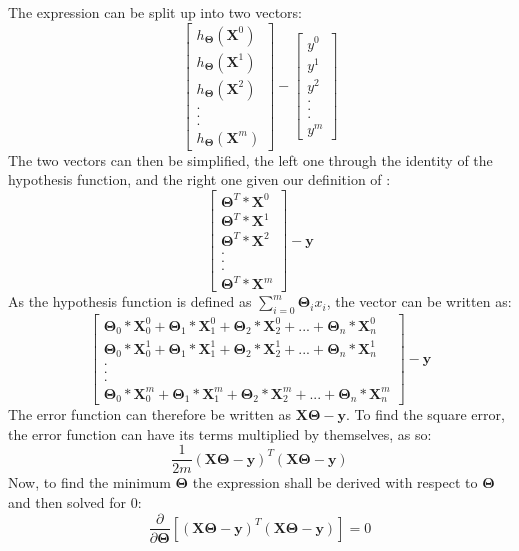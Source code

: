 \documentclass[a4paper,12pt]{article}
\begin{document}
The expression can be split up into two vectors: 
\[\begin{bmatrix} h_{\boldsymbol{\Theta}} (\boldsymbol{X}^0) \\ h_{\boldsymbol{\Theta}} (\boldsymbol{X}^1) \\ h_{\boldsymbol{\Theta}} (\boldsymbol{X}^2) \\ . \\ . \\ . \\ h_{\boldsymbol{\Theta}} (\boldsymbol{X}^m) \end{bmatrix} - \begin{bmatrix} y^0 \\ y^1 \\ y^2 \\ . \\ . \\ . \\ y^m \end{bmatrix}\]
The two vectors can then be simplified, the left one through the identity of the hypothesis function, and the right one given our definition of \unboldmath:
\[\begin{bmatrix} \boldsymbol{\Theta}^T * \boldsymbol{X}^0 \\ \boldsymbol{\Theta}^T * \boldsymbol{X}^1 \\ \boldsymbol{\Theta}^T * \boldsymbol{X}^2 \\ . \\ . \\ . \\ \boldsymbol{\Theta}^T * \boldsymbol{X}^m \end{bmatrix} - \boldsymbol{y}\]
As the hypothesis function is defined as \(\sum_{i=0}^m \boldsymbol{\Theta}_i x_i\), the vector can be written as:
\[\begin{bmatrix} \boldsymbol{\Theta}_0 * \boldsymbol{X}_0^0 + \boldsymbol{\Theta}_1 * \boldsymbol{X}_1^0 + \boldsymbol{\Theta}_2 * \boldsymbol{X}_2^0 + ... + \boldsymbol{\Theta}_n * \boldsymbol{X}_n^0 \\ \boldsymbol{\Theta}_0 * \boldsymbol{X}_0^1 + \boldsymbol{\Theta}_1 * \boldsymbol{X}_1^1 + \boldsymbol{\Theta}_2 * \boldsymbol{X}_2^1 + ... + \boldsymbol{\Theta}_n * \boldsymbol{X}_n^1 \\ . \\ . \\ . \\ \boldsymbol{\Theta}_0 * \boldsymbol{X}_0^m + \boldsymbol{\Theta}_1 * \boldsymbol{X}_1^m + \boldsymbol{\Theta}_2 * \boldsymbol{X}_2^m + ... + \boldsymbol{\Theta}_n * \boldsymbol{X}_n^m \end{bmatrix} - \boldsymbol{y}\]
The error function can therefore be written as \(\boldsymbol{X\Theta} - \boldsymbol{y}\). To find the square error, the error function can have its terms multiplied by themselves, as so:
\[\frac{1}{2m}(\boldsymbol{X\Theta} - \boldsymbol{y})^T(\boldsymbol{X\Theta} - \boldsymbol{y})\]
Now, to find the minimum \(\boldsymbol{\Theta}\) the expression shall be derived with respect to \(\boldsymbol{\Theta}\) and then solved for \(0\):
\[\frac{\partial}{\partial\boldsymbol{\Theta}}[(\boldsymbol{X\Theta} - \boldsymbol{y})^T(\boldsymbol{X\Theta} - \boldsymbol{y})] = 0\]
\end{document}
